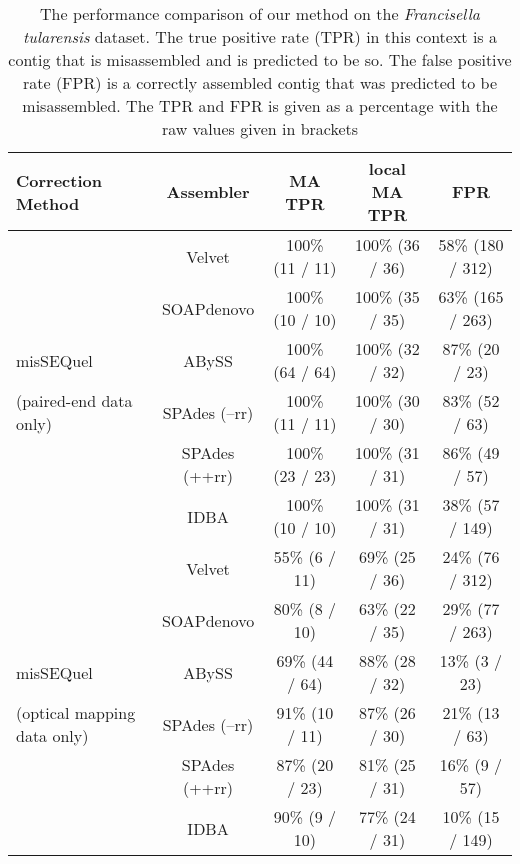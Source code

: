 \begin{table}[h!]
\begin{center}
\caption{The performance comparison of our method on the \emph{Francisella tularensis} dataset. 
The true positive rate (TPR) in this context is a contig that is misassembled and is predicted to be so. 
The false positive rate (FPR) is a correctly assembled contig that was predicted to be misassembled.
The TPR and FPR is given as a percentage with the raw values given in brackets}
{\setlength{\tabcolsep}{1em}
\begin{tabular}{|l|c|c|c|c|}
\hline
\textbf{Correction Method}								& \textbf{Assembler}		&{\bf MA TPR}			& {\bf local MA TPR}		& \textbf{FPR}	\\ \hline
							& Velvet				& 100\% (11 / 11)		& 100\% (36 / 36)		& 58\% (180 / 312)		\\ 
							& SOAPdenovo		& 100\% (10 / 10)		& 100\% (35 / 35)		& 63\% (165 / 263)	\\ 
 misSEQuel								& ABySS				& 100\% (64 / 64)		& 100\% (32 / 32)		& 87\% (20 / 23)			\\ 
(paired-end data only)				& SPAdes (--rr)			& 100\% (11 / 11)		& 100\% (30 / 30)		& 83\% (52 / 63)		\\ 
							& SPAdes (++rr)		& 100\% (23 / 23)		& 100\% (31 / 31)		& 86\% (49 / 57)		\\ 
							& IDBA				& 100\% (10 / 10)		& 100\% (31 / 31)		& 38\% (57 / 149) \\ \hline \hline
				
							& Velvet				& 55\% (6 / 11)			& 69\% (25 / 36)			& 24\% (76 / 312)	\\ 
							& SOAPdenovo		& 80\% (8 / 10)			& 63\% (22 / 35)			& 29\% (77 / 263)	\\ 
misSEQuel					& ABySS				& 69\% (44 / 64)		& 88\% (28 / 32)			& 13\% (3 / 23)		\\ 
(optical mapping data only)		& SPAdes (--rr)			& 91\% (10 / 11)		& 87\% (26 / 30)			& 21\% (13 / 63)		\\ 
							& SPAdes (++rr)		& 87\% (20 / 23)		& 81\% (25 / 31)			& 16\% (9 / 57)			\\ 
							& IDBA				& 90\% (9 / 10)			& 77\% (24 / 31)			& 10\% (15 / 149)		\\ 
\hline \hline
					

\end{tabular}}
\end{center}
\end{table}
